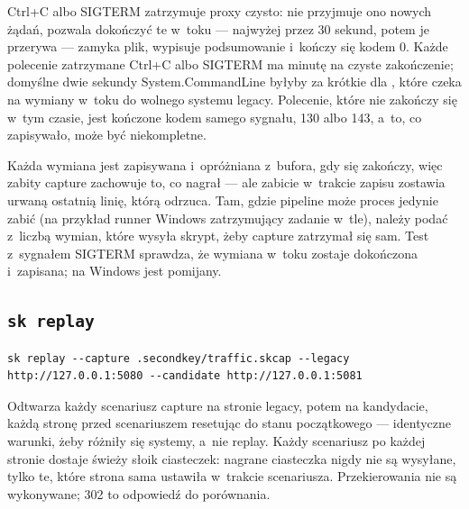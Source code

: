 Ctrl+C albo SIGTERM zatrzymuje proxy czysto: nie przyjmuje ono nowych żądań, pozwala
dokończyć te w~toku --- najwyżej przez 30 sekund, potem je przerywa --- zamyka plik, wypisuje
podsumowanie i~kończy się kodem 0. Każde polecenie zatrzymane Ctrl+C albo SIGTERM ma minutę na
czyste zakończenie; domyślne dwie sekundy System.CommandLine byłyby za krótkie dla
, które czeka na wymiany w~toku do wolnego systemu legacy. Polecenie,
które nie zakończy się w~tym czasie, jest kończone kodem samego sygnału, 130 albo 143, a~to,
co zapisywało, może być niekompletne.

Każda wymiana jest zapisywana i~opróżniana z~bufora, gdy się zakończy, więc zabity capture
zachowuje to, co nagrał --- ale zabicie w~trakcie zapisu zostawia urwaną ostatnią linię,
którą  odrzuca. Tam, gdzie pipeline może proces jedynie zabić (na
przykład runner Windows zatrzymujący zadanie w~tle), należy podać  z~liczbą wymian, które wysyła skrypt, żeby capture zatrzymał się sam. Test z~sygnałem SIGTERM
sprawdza, że wymiana w~toku zostaje dokończona i~zapisana; na Windows jest pomijany.


\subsection{\texttt{sk replay}}\label{sec:cli-replay}

\begin{lstlisting}
sk replay --capture .secondkey/traffic.skcap --legacy http://127.0.0.1:5080 --candidate http://127.0.0.1:5081
\end{lstlisting}

Odtwarza każdy scenariusz capture na stronie legacy, potem na kandydacie, każdą stronę przed
scenariuszem resetując do stanu początkowego --- identyczne warunki, żeby różniły się systemy,
a~nie replay. Każdy scenariusz po każdej stronie dostaje świeży słoik ciasteczek: nagrane
ciasteczka nigdy nie są wysyłane, tylko te, które strona sama ustawiła w~trakcie scenariusza.
Przekierowania nie są wykonywane; 302 to odpowiedź do porównania.

